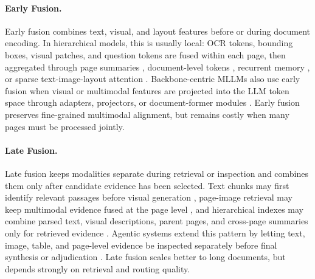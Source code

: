 \documentclass[11pt]{article}
\begin{document}
\paragraph{Early Fusion.}
Early fusion combines text, visual, and layout features before or during document encoding. In hierarchical models, this is usually local: OCR tokens, bounding boxes, visual patches, and question tokens are fused within each page, then aggregated through page summaries \cite{tito2023hierarchical}, document-level tokens \cite{blau2024gram}, recurrent memory \cite{dong2024multi}, or sparse text-image-layout attention \cite{borchmann2025arctic}. Backbone-centric MLLMs also use early fusion when visual or multimodal features are projected into the LLM token space through adapters, projectors, or document-former modules \cite{tanaka2024instructdoc, duan2025docopilot, jia2024leopard}. Early fusion preserves fine-grained multimodal alignment, but remains costly when many pages must be processed jointly.


\paragraph{Late Fusion.}
Late fusion keeps modalities separate during retrieval or inspection and combines them only after candidate evidence has been selected. Text chunks may first identify relevant passages before visual generation \cite{zhang2024cream}, page-image retrieval may keep multimodal evidence fused at the page level \cite{cho2024m3docrag}, and hierarchical indexes may combine parsed text, visual descriptions, parent pages, and cross-page summaries only for retrieved evidence \cite{gong2025mhier}. Agentic systems extend this pattern by letting text, image, table, and page-level evidence be inspected separately before final synthesis or adjudication \cite{han2025mdocagent, duan2025m2rag, zhu2025doclens}. Late fusion scales better to long documents, but depends strongly on retrieval and routing quality.
\end{document}
